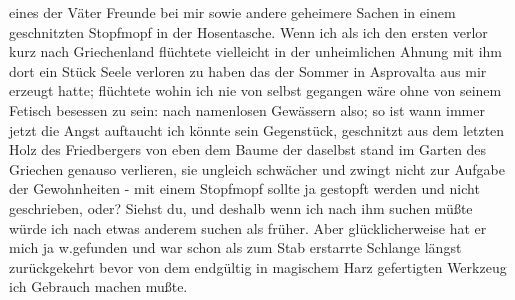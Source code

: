 \documentclass[
]{article}
\begin{document}
eines der Väter Freunde bei mir sowie andere geheimere Sachen in einem
geschnitzten Stopfmopf in der Hosentasche. Wenn ich als ich den ersten
verlor kurz nach Griechenland flüchtete vielleicht in der unheimlichen
Ahnung mit ihm dort ein Stück Seele verloren zu haben das der Sommer in
Asprovalta aus mir erzeugt hatte; flüchtete wohin ich nie von selbst
gegangen wäre ohne von seinem Fetisch besessen zu sein: nach namenlosen
Gewässern also; so ist wann immer jetzt die Angst auftaucht ich könnte
sein Gegenstück, geschnitzt aus dem letzten Holz des Friedbergers von
eben dem Baume der daselbst stand im Garten des Griechen genauso
verlieren, sie ungleich schwächer und zwingt nicht zur Aufgabe der
Gewohnheiten - mit einem Stopfmopf sollte ja gestopft werden und nicht
geschrieben, oder? Siehst du, und deshalb wenn ich nach ihm suchen müßte
würde ich nach etwas anderem suchen als früher. Aber glücklicherweise
hat er mich ja w.gefunden und war schon als zum Stab erstarrte Schlange
längst zurückgekehrt bevor von dem endgültig in magischem Harz
gefertigten Werkzeug ich Gebrauch machen mußte.
\end{document}
